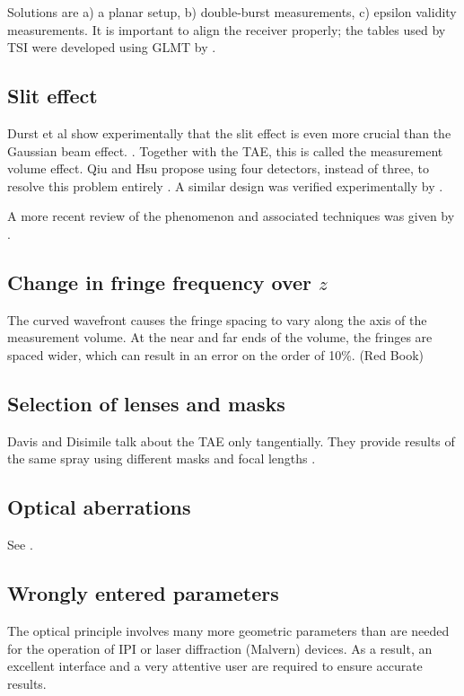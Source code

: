 \documentclass[11.5pt]{book}
\begin{document}
Solutions are a) a planar setup, b) double-burst measurements, c) epsilon
validity measurements. It is important to align the receiver properly; the
tables used by TSI were developed using GLMT by \citet{Naqwi96}.

\subsection{Slit effect}
Durst et al show experimentally that the slit effect is even more crucial than
the Gaussian beam effect. \cite{Durst94}. Together with the TAE, this
is called the measurement volume effect. Qiu and Hsu propose using four
detectors, instead of three, to resolve this problem entirely \cite{Qiu99}. A
similar design was verified experimentally by \citet{Sipperley14}.

A more recent review of the phenomenon and associated techniques was given by
\citet{Strakey00, Strakey01}.

\subsection{Change in fringe frequency over $z$}
The curved wavefront causes the fringe spacing to vary along the axis of the
measurement volume. At the near and far ends of the volume, the fringes are
spaced wider, which can result in an error on the order of 10\%. (Red Book)

\subsection{Selection of lenses and masks}
Davis and Disimile talk about the TAE only tangentially. They provide results of
the same spray using different masks and focal lengths \cite{Davis04}.

\subsection{Optical aberrations}
See \citet{Dressler90}.

\subsection{Wrongly entered parameters}
The optical principle involves many more geometric parameters than are needed
for the operation of IPI or laser diffraction (Malvern) devices. As a result, an
excellent interface and a very attentive user are required to ensure accurate
results.
\end{document}
